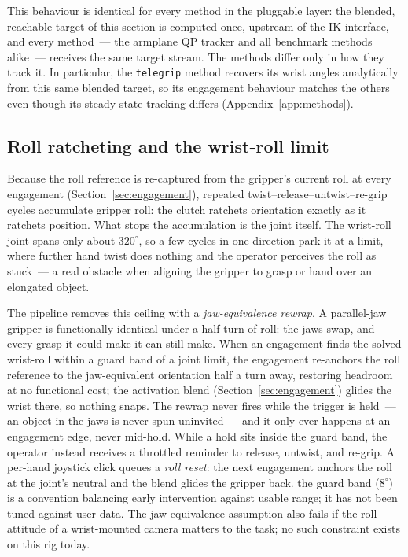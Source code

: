 This behaviour is identical for every method in the pluggable layer: the
blended, reachable target of this section is computed once, upstream of
the IK interface, and every method~--- the armplane QP tracker and all
benchmark methods alike~--- receives the same target stream. The methods
differ only in how they track it. In particular, the \texttt{telegrip}
method recovers its wrist angles analytically from this same blended
target, so its engagement behaviour matches the others even though its
steady-state tracking differs (Appendix~\ref{app:methods}).

\subsection{Roll ratcheting and the wrist-roll limit}
\label{sec:ratchet}

Because the roll reference is re-captured from the gripper's current
roll at every engagement (Section~\ref{sec:engagement}), repeated
twist--release--untwist--re-grip cycles accumulate gripper roll: the
clutch ratchets orientation exactly as it ratchets position. What stops
the accumulation is the joint itself. The wrist-roll joint spans only
about \(320^\circ\), so a few cycles in one direction park it at a
limit, where further hand twist does nothing and the operator perceives
the roll as stuck~--- a real obstacle when aligning the gripper to grasp
or hand over an elongated object.

The pipeline removes this ceiling with a \emph{jaw-equivalence rewrap}.
A parallel-jaw gripper is functionally identical under a half-turn of
roll: the jaws swap, and every grasp it could make it can still make.
When an engagement finds the solved wrist-roll within a guard band of a
joint limit, the engagement re-anchors the roll reference to the
jaw-equivalent orientation half a turn away, restoring headroom at no
functional cost; the activation blend (Section~\ref{sec:engagement})
glides the wrist there, so nothing snaps. The rewrap never fires while
the trigger is held~--- an object in the jaws is never spun uninvited
--- and it only ever happens at an engagement edge, never mid-hold.
While a hold sits inside the guard band, the operator instead receives a
throttled reminder to release, untwist, and re-grip. A per-hand joystick
click queues a \emph{roll reset}: the next engagement anchors the roll
at the joint's neutral and the blend glides the gripper back.
\unjustified{} the guard band (\(8^\circ\)) is a convention balancing
early intervention against usable range; it has not been tuned against
user data. The jaw-equivalence assumption also fails if the roll
attitude of a wrist-mounted camera matters to the task; no such
constraint exists on this rig today.

